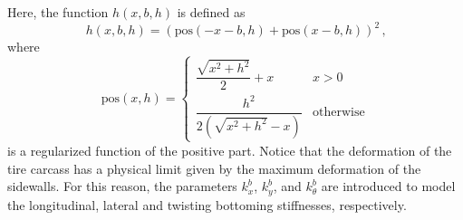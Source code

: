 %
Here, the function $h(x,b,h)$ is defined as
%
\begin{equation}
  h(x,b,h) = \left(\mathrm{pos}(-x-b, h) + \mathrm{pos}(x-b, h)\right)^2 \, \text{,}
\end{equation}
%
where
%
\begin{equation}
  \mathrm{pos}(x,h) =
  \begin{cases}
    \dfrac{\sqrt{x^2 + h^2}}{2}+x    & x > 0 \\[0.5em]
    \dfrac{h^2}{2(\sqrt{x^2+h^2}-x)} & \mathrm{otherwise}
  \end{cases}
\end{equation}
%
is a regularized function of the positive part. Notice that the deformation of the tire carcass has a physical limit given by the maximum deformation of the sidewalls. For this reason, the parameters $k_x^b$, $k_y^b$, and $k_\theta^b$ are introduced to model the longitudinal, lateral and twisting bottoming stiffnesses, respectively.

